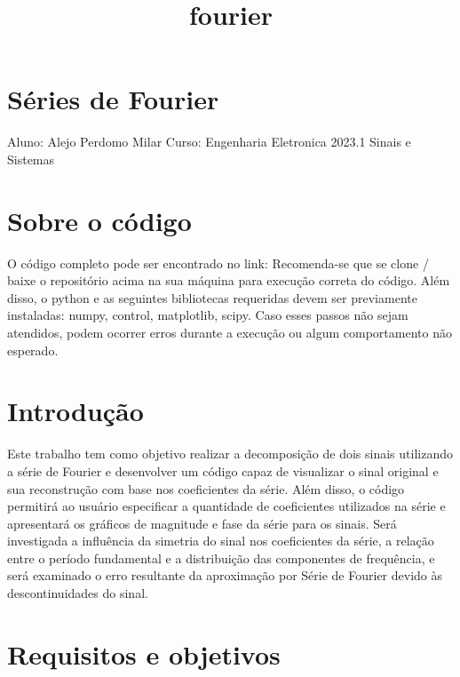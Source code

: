 \documentclass[11pt]{article}
\title{fourier}
\begin{document}
    
    \maketitle
    
    

    
    \hypertarget{suxe9ries-de-fourier}{%
\section{Séries de Fourier}\label{suxe9ries-de-fourier}}

Aluno: Alejo Perdomo Milar Curso: Engenharia Eletronica 2023.1 Sinais e
Sistemas

\hypertarget{sobre-o-cuxf3digo}{%
\section{Sobre o código}\label{sobre-o-cuxf3digo}}

O código completo pode ser encontrado no link: \href{}{} Recomenda-se
que se clone / baixe o repositório acima na sua máquina para execução
correta do código. Além disso, o python e as seguintes bibliotecas
requeridas devem ser previamente instaladas: numpy, control, matplotlib,
scipy. Caso esses passos não sejam atendidos, podem ocorrer erros
durante a execução ou algum comportamento não esperado.

    \hypertarget{introduuxe7uxe3o}{%
\section{Introdução}\label{introduuxe7uxe3o}}

Este trabalho tem como objetivo realizar a decomposição de dois sinais
utilizando a série de Fourier e desenvolver um código capaz de
visualizar o sinal original e sua reconstrução com base nos coeficientes
da série. Além disso, o código permitirá ao usuário especificar a
quantidade de coeficientes utilizados na série e apresentará os gráficos
de magnitude e fase da série para os sinais. Será investigada a
influência da simetria do sinal nos coeficientes da série, a relação
entre o período fundamental e a distribuição das componentes de
frequência, e será examinado o erro resultante da aproximação por Série
de Fourier devido às descontinuidades do sinal.

\hypertarget{requisitos-e-objetivos}{%
\section{Requisitos e objetivos}\label{requisitos-e-objetivos}}
\end{document}
